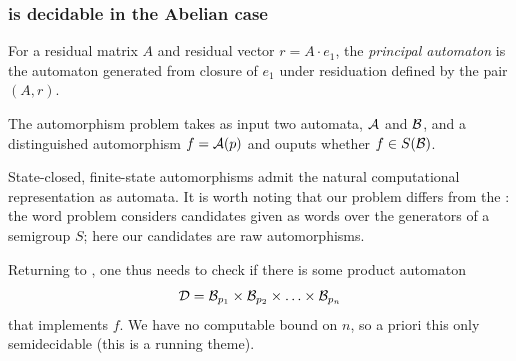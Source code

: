 \documentclass[11pt, titlepage]{article}
\begin{document}
\begin{example}
\begin{center}
\end{center}
\end{example}

\subsubsection{ is decidable in the Abelian case}

\begin{definition}
  For a residual matrix $A$ and residual vector $r = A \cdot e_1$, the
  \emph{principal automaton} is the automaton generated from closure
  of $e_1$ under residuation defined by the pair $(A, r)$.
\end{definition}

\begin{definition}
  The automorphism  problem takes as input two
  automata, $\mathcal{A}$ and $\mathcal{B}$, and a distinguished automorphism
  $f = \mathcal{A}(p)$ and ouputs whether $f \in S(\mathcal{B})$.
\end{definition}

State-closed, finite-state automorphisms admit the natural
computational representation as automata. It is worth noting that our
 problem differs from the :
the word problem considers candidates given as words over the
generators of a semigroup $S$; here our candidates are raw
automorphisms.

Returning to , one thus needs to check if there is
some product automaton
\[
  \mathcal{D} = \mathcal{B}_{p_1} \times \mathcal{B}_{p_2} \times \ldots \times \mathcal{B}_{p_n}
\]
that implements $f$. We have no computable bound on $n$, so a priori
this only semidecidable (this is a running theme).
\end{document}
